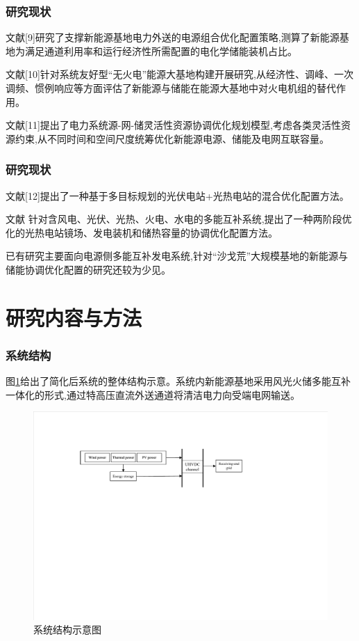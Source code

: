 \documentclass{beamer}
\begin{document}
\begin{frame}
	\frametitle{研究现状} 
    文献[9]研究了支撑新能源基地电力外送的电源组合优化配置策略,测算了新能源基地为满足通道利用率和运行经济性所需配置的电化学储能装机占比。
	
	文献[10]针对系统友好型“无火电”能源大基地构建开展研究,从经济性、调峰、一次调频、惯例响应等方面评估了新能源与储能在能源大基地中对火电机组的替代作用。
	
	文献[11]提出了电力系统源-网-储灵活性资源协调优化规划模型,考虑各类灵活性资源约束,从不同时间和空间尺度统筹优化新能源电源、储能及电网互联容量。
\end{frame}

\begin{frame}
	\frametitle{研究现状} 
	文献[12]提出了一种基于多目标规划的光伏电站+光热电站的混合优化配置方法。
	
	文献 针对含风电、光伏、光热、火电、水电的多能互补系统,提出了一种两阶段优化的光热电站镜场、发电装机和储热容量的协调优化配置方法。

	已有研究主要面向电源侧多能互补发电系统,针对“沙戈荒”大规模基地的新能源与储能协调优化配置的研究还较为少见。
\end{frame}

\section{研究内容与方法}

\begin{frame}
	\frametitle{系统结构} 
	\qquad 图\ref*{fig.1}给出了简化后系统的整体结构示意。系统内新能源基地采用风光火储多能互补一体化的形式,通过特高压直流外送通道将清洁电力向受端电网输送。
	\begin{figure}[htbp]  
		\centering  
		\includegraphics[scale=0.6]{./pic/系统结构示意图.pdf}
		\caption{系统结构示意图}
		\label{fig.1}
	\end{figure}
\end{frame}
\end{document}
